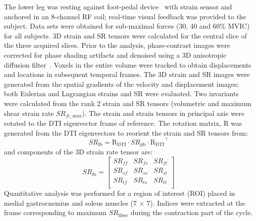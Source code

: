 The lower leg was resting against foot-pedal device~\cite{RNSS10} with strain sensor and anchored in an 8-channel RF coil; real-time visual feedback was provided to the subject. 
Data sets were obtained for sub-maximal forces (30, 40 and 60\% MVIC) for all subjects. 
3D strain and SR tensors were calculated for the central slice of the three acquired slices. 
Prior to the analysis, phase-contrast images were corrected for phase shading artifacts and denoised using a 3D anisotropic diffusion filter~\cite{RNCS17}.
Voxels in the entire volume were tracked to obtain displacements and locations in subsequent temporal frames. 
The 3D strain and SR images were generated from the spatial gradients of the velocity and displacement images; both Eulerian and Lagrangian strains and SR were evaluated. 
Two invariants were calculated from the rank 2 strain and SR tensors (volumetric and maximum shear strain rate $SR_{fc\_\,\mathrm{max}}$). 
The strain and strain tensors in principal axis were rotated to the DTI eigenvector frame of reference. 
The rotation matrix, R was generated from the DTI eigenvectors to reorient the strain and SR tensors from:
\begin{equation}\label{eq: SRDTI}
SR_{\mathrm{fb}}=\mathrm{R_{DTI}}\cdot SR_{\mathrm{pb}} \cdot \mathrm{R_{DTI}}^\intercal
\end{equation}
and components of the 3D strain rate tensor are:
\begin{equation}
SR_{\mathrm{fb}} =\left[
\begin{array}{ccc}
SR_{ff} & SR_{fs} & SR_{ft} \\[4pt]
SR_{sf} & SR_{ss} & SR_{st} \\[4pt]
SR_{tf} & SR_{ts} & SR_{tt} \\
\end{array}\right]
\end{equation}
Quantitative analysis was performed for a region of interest (ROI) placed in medial gastrocnemius and soleus muscles (7 $\times$ 7).
Indices were extracted at the frame corresponding to maximum $SR_\mathrm{fiber}$ during the contraction part of the cycle.
